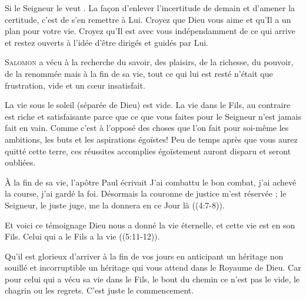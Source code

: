 \Og Si le Seigneur le veut \Fg{}. La fa\c{c}on d'enlever l'incertitude de demain
 et d'amener la certitude, c'est de s'en remettre à Lui.
 Croyez que Dieu vous aime et qu'Il a un plan pour votre vie.
 Croyez qu'Il est avec vous indépendamment de ce qui arrive
 \ocadr et restez ouverts à l'idée d'être dirigés et guidés par Lui.

\dvrule






\lettrine{S}{alomon} a vécu à la recherche du savoir, des plaisirs,
 de la richesse, du pouvoir, de la renommée
 \ocadr mais à la fin de sa vie, tout ce qui lui est resté
 n'était que frustration, vide et un c\oe{}ur insatisfait. 

La vie sous le soleil (séparée de Dieu) est vide.
 La vie dans le Fils, au contraire est riche et satisfaisante
 parce que ce que vous faites pour le Seigneur n'est jamais fait en vain.
 Comme c'est à l'opposé des choses que l'on fait pour soi-même
 \ocadr les ambitions, les buts et les aspirations égoïstes!
 Peu de temps après que vous aurez quitté cette terre,
 ces réussites accomplies égoïstement auront disparu et seront oubliées. 


À la fin de sa vie, l'apôtre Paul écrivait\frcolon{} 
 \Og J'ai combattu le bon combat, j'ai achevé la course, j'ai gardé la foi.
 Désormais la couronne de justice m'est réservée ;
 le Seigneur, le juste juge, me la donnera en ce Jour là \Fg{}
 ((4:7-8)). 

Et voici ce témoignage\frcolon{}
 \Og Dieu nous a donné la vie éternelle, et cette vie est en son Fils.
 Celui qui a le Fils a la vie \Fg{} ((5:11-12)). 

Qu'il est glorieux d'arriver à la fin de vos jours en anticipant un héritage
 non souillé et incorruptible \ocadr un héritage qui vous attend
 dans le Royaume de Dieu.
 Car pour celui qui a vécu sa vie dans le Fils, le bout du chemin
 ce n'est pas le vide, le chagrin ou les regrets. C'est juste le commencement. 

